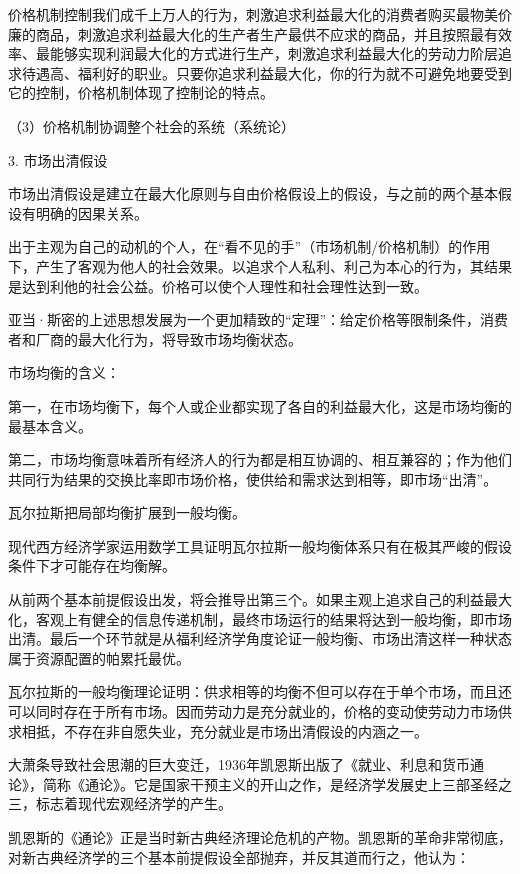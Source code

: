 \documentclass{article}
\begin{document}
价格机制控制我们成千上万人的行为，刺激追求利益最大化的消费者购买最物美价廉的商品，刺激追求利益最大化的生产者生产最供不应求的商品，并且按照最有效率、最能够实现利润最大化的方式进行生产，刺激追求利益最大化的劳动力阶层追求待遇高、福利好的职业。只要你追求利益最大化，你的行为就不可避免地要受到它的控制，价格机制体现了控制论的特点。

（3）价格机制协调整个社会的系统（系统论）


3. 市场出清假设

市场出清假设是建立在最大化原则与自由价格假设上的假设，与之前的两个基本假设有明确的因果关系。

出于主观为自己的动机的个人，在“看不见的手”（市场机制/价格机制）的作用下，产生了客观为他人的社会效果。以追求个人私利、利己为本心的行为，其结果是达到利他的社会公益。价格可以使个人理性和社会理性达到一致。

亚当·斯密的上述思想发展为一个更加精致的“定理”：给定价格等限制条件，消费者和厂商的最大化行为，将导致市场均衡状态。

市场均衡的含义：

第一，在市场均衡下，每个人或企业都实现了各自的利益最大化，这是市场均衡的最基本含义。

第二，市场均衡意味着所有经济人的行为都是相互协调的、相互兼容的；作为他们共同行为结果的交换比率即市场价格，使供给和需求达到相等，即市场“出清”。

瓦尔拉斯把局部均衡扩展到一般均衡。

现代西方经济学家运用数学工具证明瓦尔拉斯一般均衡体系只有在极其严峻的假设条件下才可能存在均衡解。

从前两个基本前提假设出发，将会推导出第三个。如果主观上追求自己的利益最大化，客观上有健全的信息传递机制，最终市场运行的结果将达到一般均衡，即市场出清。最后一个环节就是从福利经济学角度论证一般均衡、市场出清这样一种状态属于资源配置的帕累托最优。

瓦尔拉斯的一般均衡理论证明：供求相等的均衡不但可以存在于单个市场，而且还可以同时存在于所有市场。因而劳动力是充分就业的，价格的变动使劳动力市场供求相抵，不存在非自愿失业，充分就业是市场出清假设的内涵之一。

\hspace*{\fill}

大萧条导致社会思潮的巨大变迁，1936年凯恩斯出版了《就业、利息和货币通论》，简称《通论》。它是国家干预主义的开山之作，是经济学发展史上三部圣经之三，标志着现代宏观经济学的产生。

凯恩斯的《通论》正是当时新古典经济理论危机的产物。凯恩斯的革命非常彻底，对新古典经济学的三个基本前提假设全部抛弃，并反其道而行之，他认为：
\end{document}
